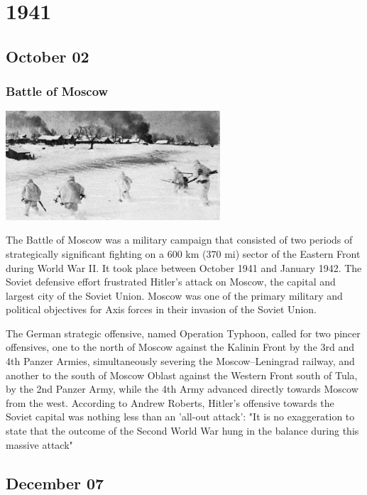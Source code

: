 \documentclass[11pt]{report}
\begin{document}
\chapter{1941}
\section{October 02}
\subsection{Battle of Moscow}
\vspace{2mm}\begin{center}\includegraphics[width=8cm]{./img/battleOfMoscow.jpg}\end{center}
The Battle of Moscow was a military campaign that consisted of two periods of strategically significant fighting on a 600 km (370 mi) sector of the Eastern Front during World War II. It took place between October 1941 and January 1942. The Soviet defensive effort frustrated Hitler's attack on Moscow, the capital and largest city of the Soviet Union. Moscow was one of the primary military and political objectives for Axis forces in their invasion of the Soviet Union.

The German strategic offensive, named Operation Typhoon, called for two pincer offensives, one to the north of Moscow against the Kalinin Front by the 3rd and 4th Panzer Armies, simultaneously severing the Moscow–Leningrad railway, and another to the south of Moscow Oblast against the Western Front south of Tula, by the 2nd Panzer Army, while the 4th Army advanced directly towards Moscow from the west. According to Andrew Roberts, Hitler's offensive towards the Soviet capital was nothing less than an 'all-out attack': "It is no exaggeration to state that the outcome of the Second World War hung in the balance during this massive attack"

\section{December 07}
\end{document}
